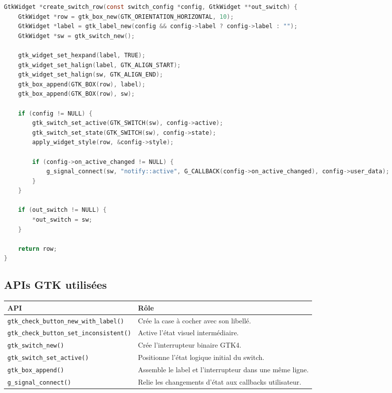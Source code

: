 \begin{lstlisting}[language=C]
GtkWidget *create_switch_row(const switch_config *config, GtkWidget **out_switch) {
    GtkWidget *row = gtk_box_new(GTK_ORIENTATION_HORIZONTAL, 10);
    GtkWidget *label = gtk_label_new(config && config->label ? config->label : "");
    GtkWidget *sw = gtk_switch_new();

    gtk_widget_set_hexpand(label, TRUE);
    gtk_widget_set_halign(label, GTK_ALIGN_START);
    gtk_widget_set_halign(sw, GTK_ALIGN_END);
    gtk_box_append(GTK_BOX(row), label);
    gtk_box_append(GTK_BOX(row), sw);

    if (config != NULL) {
        gtk_switch_set_active(GTK_SWITCH(sw), config->active);
        gtk_switch_set_state(GTK_SWITCH(sw), config->state);
        apply_widget_style(row, &config->style);

        if (config->on_active_changed != NULL) {
            g_signal_connect(sw, "notify::active", G_CALLBACK(config->on_active_changed), config->user_data);
        }
    }

    if (out_switch != NULL) {
        *out_switch = sw;
    }

    return row;
}
\end{lstlisting}

\subsection{APIs GTK utilisées}

\begin{center}
\begin{tabular}{|l|p{8cm}|}
\hline
\textbf{API} & \textbf{Rôle} \\
\hline
\texttt{gtk\_check\_button\_new\_with\_label()} & Crée la case à cocher avec son libellé. \\
\hline
\texttt{gtk\_check\_button\_set\_inconsistent()} & Active l'état visuel intermédiaire. \\
\hline
\texttt{gtk\_switch\_new()} & Crée l'interrupteur binaire GTK4. \\
\hline
\texttt{gtk\_switch\_set\_active()} & Positionne l'état logique initial du switch. \\
\hline
\texttt{gtk\_box\_append()} & Assemble le label et l'interrupteur dans une même ligne. \\
\hline
\texttt{g\_signal\_connect()} & Relie les changements d'état aux callbacks utilisateur. \\
\hline
\end{tabular}
\end{center}

\newpage
